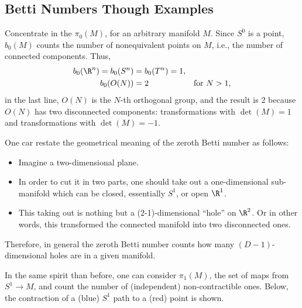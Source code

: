 \subsection{Betti Numbers Though Examples}

Concentrate in the $\pi_0(M)$, for an arbitrary manifold $M$. Since $S^0$ is a point, $b_0(M)$ counts the number of nonequivalent points on $M$, i.e., the number of connected components. Thus,
\begin{align}
  b_0(\R^n) = b_0(S^n) &= b_0(T^n) = 1, & & \\
  b_0(O(N))            &= 2            & &\text{for }N>1,
\end{align}
in the last line, $O(N)$ is the $N$-th orthogonal group, and the result is 2 because $O(N)$ has two disconnected components: transformations with $\det(M) = 1$ and transformations with $\det(M) = -1$.

One car restate the geometrical meaning of the zeroth Betti number as follows:
\begin{itemize}
\item Imagine a two-dimensional plane.
\item In order to cut it in two parts, one should take out a one-dimensional sub-manifold which can be closed, essentially $S^1$,  or open $\R^1$.
\item This taking out is nothing but a (2-1)-dimensional ``hole'' on $\R^2$. Or in other words, this transformed the connected manifold into two disconnected ones.
\end{itemize}
Therefore, in general the zeroth Betti number counts how many $(D-1)$-dimensional holes  are in a given manifold.

In  the same spirit than before, one can consider $\pi_1(M)$, the set of maps from $S^1 \to M$, and count the number of (independent) non-contractible ones. Below,%
the contraction  of a (blue) $S^1$ path to a (red) point is shown.
\begin{center}
  \begin{center}
  \end{center}
\end{center}

